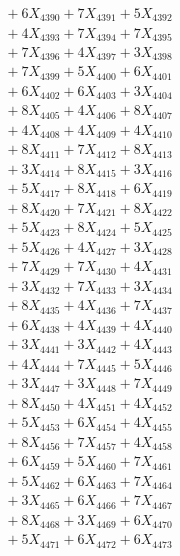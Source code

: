 \documentclass[a4paper,10pt]{article}
\begin{document}
{\begin{align}
&\;  + 6 X_{4390} + 7 X_{4391} + 5 X_{4392} \\[0.3ex]
&\;  + 4 X_{4393} + 7 X_{4394} + 7 X_{4395} \\[0.3ex]
&\;  + 7 X_{4396} + 4 X_{4397} + 3 X_{4398} \\[0.3ex]
&\;  + 7 X_{4399} + 5 X_{4400} + 6 X_{4401} \\[0.3ex]
&\;  + 6 X_{4402} + 6 X_{4403} + 3 X_{4404} \\[0.3ex]
&\;  + 8 X_{4405} + 4 X_{4406} + 8 X_{4407} \\[0.3ex]
&\;  + 4 X_{4408} + 4 X_{4409} + 4 X_{4410} \\[0.3ex]
&\;  + 8 X_{4411} + 7 X_{4412} + 8 X_{4413} \\[0.3ex]
&\;  + 3 X_{4414} + 8 X_{4415} + 3 X_{4416} \\[0.3ex]
&\;  + 5 X_{4417} + 8 X_{4418} + 6 X_{4419} \\[0.5ex]\allowbreak
&\;  + 8 X_{4420} + 7 X_{4421} + 8 X_{4422} \\[0.3ex]
&\;  + 5 X_{4423} + 8 X_{4424} + 5 X_{4425} \\[0.3ex]
&\;  + 5 X_{4426} + 4 X_{4427} + 3 X_{4428} \\[0.3ex]
&\;  + 7 X_{4429} + 7 X_{4430} + 4 X_{4431} \\[0.3ex]
&\;  + 3 X_{4432} + 7 X_{4433} + 3 X_{4434} \\[0.3ex]
&\;  + 8 X_{4435} + 4 X_{4436} + 7 X_{4437} \\[0.3ex]
&\;  + 6 X_{4438} + 4 X_{4439} + 4 X_{4440} \\[0.3ex]
&\;  + 3 X_{4441} + 3 X_{4442} + 4 X_{4443} \\[0.3ex]
&\;  + 4 X_{4444} + 7 X_{4445} + 5 X_{4446} \\[0.3ex]
&\;  + 3 X_{4447} + 3 X_{4448} + 7 X_{4449} \\[0.5ex]\allowbreak
&\;  + 8 X_{4450} + 4 X_{4451} + 4 X_{4452} \\[0.3ex]
&\;  + 5 X_{4453} + 6 X_{4454} + 4 X_{4455} \\[0.3ex]
&\;  + 8 X_{4456} + 7 X_{4457} + 4 X_{4458} \\[0.3ex]
&\;  + 6 X_{4459} + 5 X_{4460} + 7 X_{4461} \\[0.3ex]
&\;  + 5 X_{4462} + 6 X_{4463} + 7 X_{4464} \\[0.3ex]
&\;  + 3 X_{4465} + 6 X_{4466} + 7 X_{4467} \\[0.3ex]
&\;  + 8 X_{4468} + 3 X_{4469} + 6 X_{4470} \\[0.3ex]
&\;  + 5 X_{4471} + 6 X_{4472} + 6 X_{4473} \\[0.3ex]

\end{align}}
\end{document}
